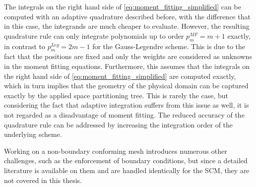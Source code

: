 The integrals on the right hand side of \ref{eq:moment_fitting_simplified} can be computed with an adaptive quadrature described before, with the difference that in this case, the integrands are much cheaper to evaluate. However, the resulting quadrature rule can only integrate polynomials up to order $p_m^{MF}=m+1$ exactly, in contrast to $p_m^{Leg}=2m-1$ for the Gauss-Legendre scheme. This is due to the fact that the positions are fixed and only the weights are considered as unknowns in the moment fitting equations.
Furthermore, this assumes that the integrals on the right hand side of \ref{eq:moment_fitting_simplified} are computed exactly, which in turn implies that the geometry of the physical domain can be captured exactly by the applied space partitioning tree. This is rarely the case, but considering the fact that adaptive integration suffers from this issue as well, it is not regarded as a disadvantage of moment fitting. The reduced accuracy of the quadrature rule can be addressed by increasing the integration order of the underlying scheme.


Working on a non-boundary conforming mesh introduces numerous other challenges, such as the enforcement of boundary conditions, but since a detailed literature is available on them \cite{Duester2007, Parvizian2007} and are handled identically for the SCM, they are not covered in this thesis.